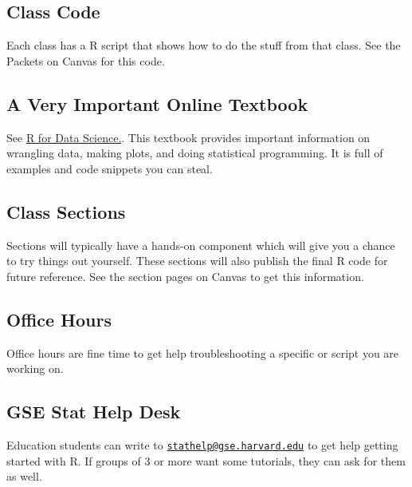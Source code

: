 \documentclass[
  letterpaper,
  DIV=11,
  numbers=noendperiod]{scrreprt}
\begin{document}
\hypertarget{class-code}{%
\subsection*{Class Code}\label{class-code}}

Each class has a R script that shows how to do the stuff from that
class. See the Packets on Canvas for this code.

\hypertarget{a-very-important-online-textbook}{%
\subsection*{A Very Important Online
Textbook}\label{a-very-important-online-textbook}}

See \href{http://r4ds.had.co.nz/}{R for Data Science.}. This textbook
provides important information on wrangling data, making plots, and
doing statistical programming. It is full of examples and code snippets
you can steal.

\hypertarget{class-sections}{%
\subsection*{Class Sections}\label{class-sections}}

Sections will typically have a hands-on component which will give you a
chance to try things out yourself. These sections will also publish the
final R code for future reference. See the section pages on Canvas to
get this information.

\hypertarget{office-hours}{%
\subsection*{Office Hours}\label{office-hours}}

Office hours are fine time to get help troubleshooting a specific or
script you are working on.

\hypertarget{gse-stat-help-desk}{%
\subsection*{GSE Stat Help Desk}\label{gse-stat-help-desk}}

Education students can write to
\href{mailto:stathelp@gse.harvard.edu}{\nolinkurl{stathelp@gse.harvard.edu}}
to get help getting started with R. If groups of 3 or more want some
tutorials, they can ask for them as well.
\end{document}
